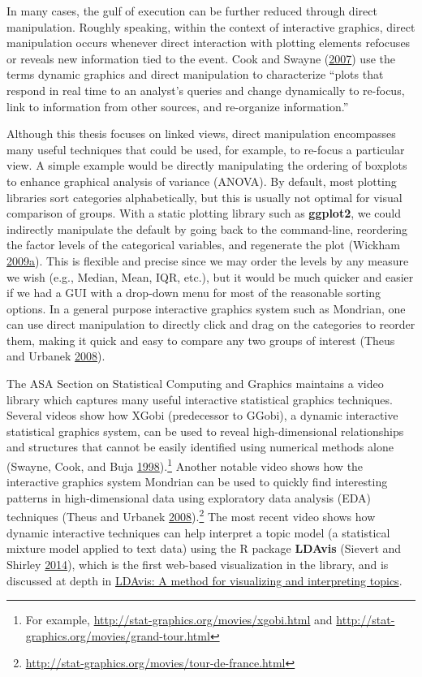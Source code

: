 \documentclass[12pt,]{isuthesis}
\let\rmarkdownfootnote\footnote%
\def\footnote{\protect\rmarkdownfootnote}
\begin{document}
In many cases, the gulf of execution can be further reduced through
direct manipulation. Roughly speaking, within the context of interactive
graphics, direct manipulation occurs whenever direct interaction with
plotting elements refocuses or reveals new information tied to the
event. Cook and Swayne (\protect\hyperlink{ref-ggobi:2007}{2007}) use
the terms dynamic graphics and direct manipulation to characterize
``plots that respond in real time to an analyst's queries and change
dynamically to re-focus, link to information from other sources, and
re-organize information.''

Although this thesis focuses on linked views, direct manipulation
encompasses many useful techniques that could be used, for example, to
re-focus a particular view. A simple example would be directly
manipulating the ordering of boxplots to enhance graphical analysis of
variance (ANOVA). By default, most plotting libraries sort categories
alphabetically, but this is usually not optimal for visual comparison of
groups. With a static plotting library such as \textbf{ggplot2}, we
could indirectly manipulate the default by going back to the
command-line, reordering the factor levels of the categorical variables,
and regenerate the plot (Wickham
\protect\hyperlink{ref-ggplot2}{2009}\protect\hyperlink{ref-ggplot2}{a}).
This is flexible and precise since we may order the levels by any
measure we wish (e.g., Median, Mean, IQR, etc.), but it would be much
quicker and easier if we had a GUI with a drop-down menu for most of the
reasonable sorting options. In a general purpose interactive graphics
system such as Mondrian, one can use direct manipulation to directly
click and drag on the categories to reorder them, making it quick and
easy to compare any two groups of interest (Theus and Urbanek
\protect\hyperlink{ref-mondrianbook}{2008}).

The ASA Section on Statistical Computing and Graphics maintains a video
library which captures many useful interactive statistical graphics
techniques. Several videos show how XGobi (predecessor to GGobi), a
dynamic interactive statistical graphics system, can be used to reveal
high-dimensional relationships and structures that cannot be easily
identified using numerical methods alone (Swayne, Cook, and Buja
\protect\hyperlink{ref-xgobi}{1998}).\footnote{For example,
  \url{http://stat-graphics.org/movies/xgobi.html} and
  \url{http://stat-graphics.org/movies/grand-tour.html}} Another notable
video shows how the interactive graphics system Mondrian can be used to
quickly find interesting patterns in high-dimensional data using
exploratory data analysis (EDA) techniques (Theus and Urbanek
\protect\hyperlink{ref-mondrianbook}{2008}).\footnote{\url{http://stat-graphics.org/movies/tour-de-france.html}}
The most recent video shows how dynamic interactive techniques can help
interpret a topic model (a statistical mixture model applied to text
data) using the R package \textbf{LDAvis} (Sievert and Shirley
\protect\hyperlink{ref-Sievert:2014b}{2014}), which is the first
web-based visualization in the library, and is discussed at depth in
\protect\hyperlink{ldavis-a-method-for-visualizing-and-interpreting-topics}{LDAvis:
A method for visualizing and interpreting topics}.
\end{document}
